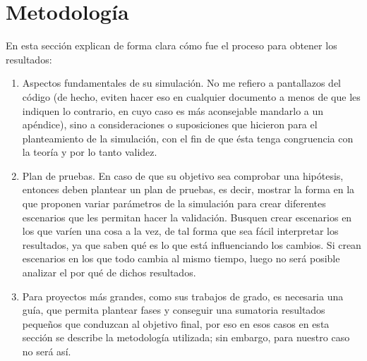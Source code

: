 \documentclass[12pt]{article}
\begin{document}
\section*{Metodología}
    En esta sección explican de forma clara cómo fue el proceso para obtener los resultados:
    \begin{enumerate}
        \item Aspectos fundamentales de su simulación. No me refiero a pantallazos del código 
        (de hecho, eviten hacer eso en cualquier documento a menos de que les indiquen 
        lo contrario, en cuyo caso es más aconsejable mandarlo a un apéndice), sino a 
        consideraciones o suposiciones que hicieron para el planteamiento de la simulación, 
        con el fin de que ésta tenga congruencia con la teoría y por lo tanto validez. 

        \item Plan de pruebas. En caso de que su objetivo sea comprobar una hipótesis, entonces 
        deben plantear un plan de pruebas, es decir, mostrar la forma en la que proponen 
        variar parámetros de la simulación para crear diferentes escenarios que les permitan 
        hacer la validación. Busquen crear escenarios en los que varíen una cosa a la vez, 
        de tal forma que sea fácil interpretar los resultados, ya que saben qué es lo que está 
        influenciando los cambios. Si crean escenarios en los que todo cambia al mismo 
        tiempo, luego no será posible analizar el por qué de dichos resultados. 

        \item Para proyectos más grandes, como sus trabajos de grado, es necesaria una guía, 
        que permita plantear fases y conseguir una sumatoria resultados pequeños que 
        conduzcan al objetivo final, por eso en esos casos en esta sección se describe la 
        metodología utilizada; sin embargo, para nuestro caso no será así. 
    \end{enumerate}
\end{document}
